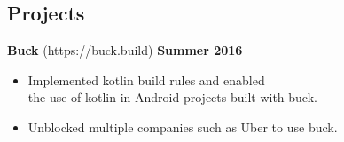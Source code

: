 \documentclass[sectioned]{dsyangres}
\begin{document}
\begin{resume}


\section{Projects}




\textbf{Buck} (https://buck.build)
\hfill \textbf{Summer 2016}
  \begin{itemize} \itemsep -2pt
    \item Implemented kotlin build rules and enabled \\ the use of kotlin in Android projects built with buck.
    \item Unblocked multiple companies such as Uber to use buck.
  \end{itemize}
  

\end{resume}
\end{document}
